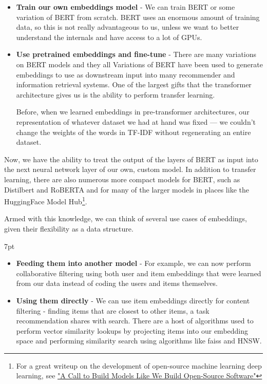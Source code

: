 \documentclass[11pt, table]{diazessay} %
\newenvironment{formal}{%
  \def\FrameCommand{%
	\hspace{1pt}%
	{\color{w_lightblue}\vrule width 2pt}%
	{\color{formalshade}\vrule width 4pt}%
	\colorbox{formalshade}%
  }%
  \MakeFramed{\advance\hsize-\width\FrameRestore}%
  \noindent\hspace{-4.55pt}%
  \begin{adjustwidth}{}{7pt}%
  \vspace{2pt}\vspace{2pt}%
}
{%
  \vspace{2pt}\end{adjustwidth}\endMakeFramed%
}
\begin{document}
\begin{sloppypar}
\begin{itemize}
\item \textbf{Train our own embeddings model} - We can train BERT or some variation of BERT from scratch. BERT uses an enormous amount of training data, so this is not really advantageous to us, unless we want to better understand the internals and have access to a lot of GPUs.
\item \textbf{Use pretrained embeddings and fine-tune } - There are many variations on BERT models and they all Variations of BERT have been used to generate embeddings to use as downstream input into many recommender and information retrieval systems.  One of the largest gifts that the transformer architecture gives us is the ability to perform transfer learning. 

Before, when we learned embeddings in pre-transformer architectures, our representation of whatever dataset we had at hand was fixed --- we couldn't change the weights of the words in TF-IDF without regenerating an entire dataset. 
\end{itemize}

Now, we have the ability to treat the output of the layers of BERT as input into the next neural network layer of our own, custom model. In addition to transfer learning, there are also numerous more compact models for BERT, such as Distilbert and RoBERTA and for many of the larger models in places like the HuggingFace Model Hub\footnote{For a great writeup on the development of open-source machine learning deep learning, see  \href{https://colinraffel.com/blog/a-call-to-build-models-like-we-build-open-source-software.html}{"A Call to Build Models Like We Build Open-Source Software"}}.  

Armed with this knowledge, we can think of several use cases of embeddings, given their flexibility as a data structure.

\begin{formal}
\begin{itemize}
\item\textbf{Feeding them into another model} - For example, we can now perform collaborative filtering using both user and item embeddings that were learned from our data instead of coding the users and items themselves.
\item\textbf{Using them directly} - We can use item embeddings directly for content filtering - finding items that are closest to other items, a task recommendation shares with search. There are a host of algorithms used to perform vector similarity lookups by projecting items into our embedding space and performing similarity search using algorithms like faiss and HNSW.   
\end{itemize}
\end{formal}


\end{sloppypar}
\end{document}

